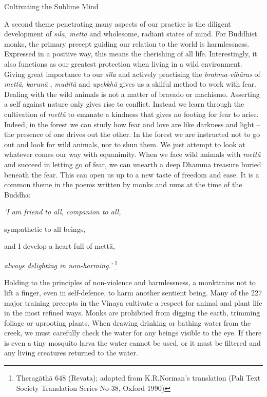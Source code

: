 Cultivating the Sublime Mind

A second theme penetrating many aspects of our practice is the diligent
development of \emph{sīla, mettā} and wholesome, radiant states of mind.
For Buddhist monks, the primary precept guiding our relation to the
world is harmlessness. Expressed in a positive way, this means the
cherishing of all life. Interestingly, it also functions as our greatest
protection when living in a wild environment. Giving great importance to
our \emph{sīla} and actively practising the \emph{brahma-vihāras} of
\emph{mettā}, \emph{karunā} , \emph{muditā} and \emph{upekkhā} gives us
a skilful method to work with fear. Dealing with the wild animals is not
a matter of bravado or machismo. Asserting a self against nature only
gives rise to conflict. Instead we learn through the cultivation of
\emph{mettā} to emanate a kindness that gives no footing for fear to
arise. Indeed, in the forest we can study how fear and love are like
darkness and light -- the presence of one drives out the other. In the
forest we are instructed not to go out and look for wild animals, nor to
shun them. We just attempt to look at whatever comes our way with
equanimity. When we face wild animals with \emph{mettā} and succeed in
letting go of fear, we can unearth a deep Dhamma treasure buried beneath
the fear. This can open us up to a new taste of freedom and ease. It is
a common theme in the poems written by monks and nuns at the time of the
Buddha:

\emph{`I am friend to all, companion to all,}

sympathetic to all beings,

and I develop a heart full of mettā,

\emph{always delighting in non-harming.'} \footnote{Theragāthā 648
  (Revata); adapted from K.R.Norman's translation (Pali Text Society
  Translation Series No 38, Oxford 1990)}

Holding to the principles of non-violence and harmlessness, a monktrains
not to lift a finger, even in self-defence, to harm another sentient
being. Many of the 227 major training precepts in the Vinaya cultivate a
respect for animal and plant life in the most refined ways. Monks are
prohibited from digging the earth, trimming foliage or uprooting plants.
When drawing drinking or bathing water from the creek, we must carefully
check the water for any beings visible to the eye. If there is even a
tiny mosquito larva the water cannot be used, or it must be filtered and
any living creatures returned to the water.

